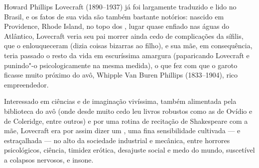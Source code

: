 \vfill

\hspace*{-.4cm}\begin{minipage}[c]{.5\linewidth}
\small{
{}}
\end{minipage}

\pagebreak

\vspace*{1.5cm}


\bigskip

\hfill{}

\bigskip
\bigskip
\bigskip

Howard Phillips Lovecraft (1890--1937) já foi largamente traduzido e lido
no Brasil, e os fatos de sua vida são também bastante notórios: nascido
em Providence, Rhode Island, no topo dos , lugar quase enfiado nas
águas do Atlântico, Lovecraft veria seu pai morrer ainda cedo de
complicações da sífilis, que o enlouqueceram (dizia coisas bizarras ao
filho), e sua mãe, em consequência, teria passado o resto da vida em
escuríssima amargura (paparicando Lovecraft e punindo"-o psicologicamente
na mesma medida), o que fez com que o garoto ficasse muito próximo do
avô, Whipple Van Buren Phillips (1833--1904), rico empreendedor.

Interessado em ciências e de imaginação vivíssima, também alimentada
pela biblioteca do avô (onde desde muito cedo leu livros robustos como
as {} de Ovídio e {} de
Coleridge, entre outros) e por uma rotina de recitação de Shakespeare
com a mãe, Lovecraft era por assim dizer um {},
uma fina sensibilidade cultivada --- e estraçalhada --- no alto da
sociedade industrial e mecânica, entre horrores psicológicos, ciência,
timidez erótica, desajuste social e medo do mundo, suscetível a colapsos
nervosos, e insone.

